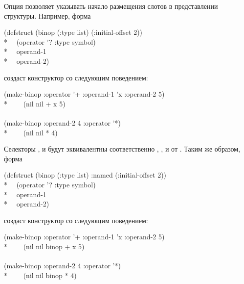 Опция  позволяет указывать начало размещения слотов в
представлении структуры. Например, форма
\begin{lisp}
(defstruct (binop (:type list) (:initial-offset 2)) \\*
~~(operator '? :type symbol) \\*
~~operand-1 \\*
~~operand-2)
\end{lisp}
создаст конструктор  со следующим поведением:
\begin{lisp}
(make-binop :operator '+ :operand-1 'x :operand-2 5) \\*
~~~\EV\ (nil nil + x 5) \\
\\
(make-binop :operand-2 4 :operator '*) \\*
~~~\EV\ (nil nil * {\nil} 4)
\end{lisp}
Селекторы
,  и  
будут эквивалентны соответственно ,
, и  от .
Таким же образом, форма
\begin{lisp}
(defstruct (binop (:type list) :named (:initial-offset 2)) \\*
~~(operator '? :type symbol) \\*
~~operand-1 \\*
~~operand-2)
\end{lisp}
создаст конструктор  со следующим поведением:
\begin{lisp}
(make-binop :operator '+ :operand-1 'x :operand-2 5) \\*
~~~\EV\ (nil nil binop + x 5) \\
\\
(make-binop :operand-2 4 :operator '*) \\*
~~~\EV\ (nil nil binop * {\nil} 4)
\end{lisp}

